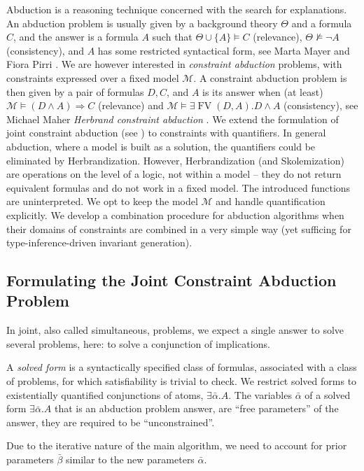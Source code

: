 \documentclass{article}
\newcommand{\tmem}[1]{{\em #1\/}}
\newcommand{\tmop}[1]{\ensuremath{\operatorname{#1}}}
\begin{document}
Abduction is a reasoning technique concerned with the search for explanations.
An abduction problem is usually given by a background theory $\Theta$ and a
formula $C$, and the answer is a formula $A$ such that $\Theta \cup \{A\}
\vDash C$ (relevance), $\Theta \nvDash \neg A$ (consistency), and $A$ has some
restricted syntactical form, see Marta Mayer and Fiora Pirri
{\cite{AbductionSequents}}. We are however interested in {\tmem{constraint
abduction}} problems, with constraints expressed over a fixed model
$\mathcal{M}$. A constraint abduction problem is then given by a pair of
formulas $D, C$, and $A$ is its answer when (at least) $\mathcal{M} \vDash (D
\wedge A) \Rightarrow C$ (relevance) and $\mathcal{M} \vDash \exists \tmop{FV}
(D, A) .D \wedge A$ (consistency), see Michael Maher{\newblock}
{\tmem{Herbrand constraint abduction}} {\cite{AbductionMaher}}. We extend the
formulation of joint constraint abduction (see {\cite{AbductionMaher}}) to
constraints with quantifiers. In general abduction, where a model is built as
a solution, the quantifiers could be eliminated by Herbrandization. However,
Herbrandization (and Skolemization) are operations on the level of a logic,
not within a model -- they do not return equivalent formulas and do not work
in a fixed model. The introduced functions are uninterpreted. We opt to keep
the model $\mathcal{M}$ and handle quantification explicitly. We develop a
combination procedure for abduction algorithms when their domains of
constraints are combined in a very simple way (yet sufficing for
type-inference-driven invariant generation).

\subsection{Formulating the Joint Constraint Abduction Problem}

In joint, also called simultaneous, problems, we expect a single answer to
solve several problems, here: to solve a conjunction of implications.

A {\tmem{solved form}} is a syntactically specified class of formulas,
associated with a class of problems, for which satisfiability is trivial to
check. We restrict solved forms to existentially quantified conjunctions of
atoms, $\exists \bar{\alpha} .A$. The variables $\bar{\alpha}$ of a solved
form $\exists \bar{\alpha} .A$ that is an abduction problem answer, are ``free
parameters'' of the answer, they are required to be ``unconstrained''.

Due to the iterative nature of the main algorithm, we need to account for
prior parameters $\bar{\beta}$ similar to the new parameters $\bar{\alpha}$.
\end{document}
